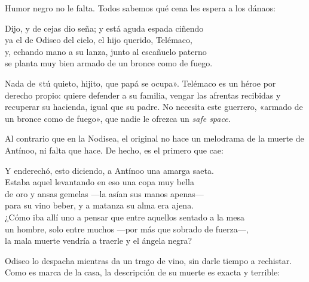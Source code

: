 Humor negro no le falta. Todos sabemos qué cena les espera a los dánaos:

\begin{versocita}
Dijo, y de cejas dio seña; y está aguda espada ciñendo\\
ya el de Odiseo del cielo, el hijo querido, Telémaco,\\
y, echando mano a su lanza, junto al escañuelo paterno\\
se planta muy bien armado de un bronce como de fuego.
\end{versocita}

Nada de «tú quieto, hijito, que papá se ocupa». Telémaco es un héroe por derecho propio: quiere defender a su familia, vengar las afrentas recibidas y recuperar su hacienda, igual que su padre. No necesita este guerrero, «armado de un bronce como de fuego», que nadie le ofrezca un \emph{safe space}.

Al contrario que en la Nodisea, el original no hace un melodrama de la muerte de Antínoo, ni falta que hace. De hecho, es el primero que cae:

\begin{versocita}
Y enderechó, esto diciendo, a Antínoo una amarga saeta.\\
Estaba aquel levantando en eso una copa muy bella\\
de oro y ansas gemelas ---la asían sus manos apenas---\\
para su vino beber, y a matanza su alma era ajena.\\
¿Cómo iba allí uno a pensar que entre aquellos sentado a la mesa\\
un hombre, solo entre muchos ---por más que sobrado de fuerza---,\\
la mala muerte vendría a traerle y el ángela negra?
\end{versocita}

Odiseo lo despacha mientras da un trago de vino, sin darle tiempo a rechistar. Como es marca de la casa, la descripción de su muerte es exacta y terrible:

